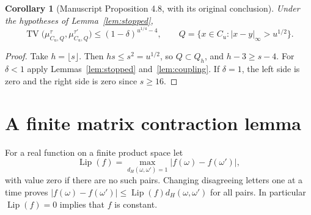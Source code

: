 \documentclass[11pt]{amsart}
\newtheorem{corollary}[theorem]{Corollary}
\theoremstyle{definition}
\newcommand{\TV}{\operatorname{TV}}
\newcommand{\Lip}{\operatorname{Lip}}
\newcommand{\1}{\mathbf 1}
\begin{document}
\begin{corollary}[Manuscript Proposition 4.8, with its original conclusion]
\label{cor:originalprop}
Under the hypotheses of Lemma~\ref{lem:stopped},
\[
 \TV\bigl(\mu_{C_u,Q}^{\tau},\mu_{C_u,Q}^{\tau'}\bigr)
 \le(1-\delta)^{u^{1/4}-4},\qquad
 Q=\{x\in C_u:|x-y|_\infty>u^{1/2}\}.
\]
\end{corollary}
\begin{proof}
Take $h=\lfloor s\rfloor$. Then $hs\le s^2=u^{1/2}$, so $Q\subset Q_h$,
and $h-3\ge s-4$. For $\delta<1$ apply Lemmas~\ref{lem:stopped}
and~\ref{lem:coupling}. If $\delta=1$, the left side is zero and the
right side is zero since $s\ge16$.
\end{proof}

\section{A finite matrix contraction lemma}
\label{sec:contraction}

For a real function on a finite product space let
\[
 \Lip(f)=\max_{d_H(\omega,\omega')=1}|f(\omega)-f(\omega')|,
\]
with value zero if there are no such pairs. Changing disagreeing letters
one at a time proves
$|f(\omega)-f(\omega')|\le\Lip(f)d_H(\omega,\omega')$ for all pairs.
In particular $\Lip(f)=0$ implies that $f$ is constant.
\end{document}
